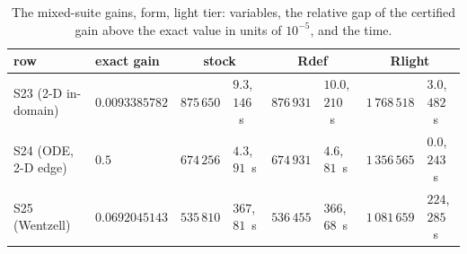 \begin{table}[h]\centering\scriptsize
\setlength{\tabcolsep}{4pt}
\begin{tabular}{llrlrlrl}
\toprule
row & exact gain & \multicolumn{2}{c}{stock} & \multicolumn{2}{c}{Rdef} & \multicolumn{2}{c}{Rlight} \\
\midrule
S23 (2-D in-domain) & $0.0093385782$ & $875\,650$ & $9.3$, $146$~s & $876\,931$ & $10.0$, $210$~s & $1\,768\,518$ & $3.0$, $482$~s \\
S24 (ODE, 2-D edge) & $0.5$ & $674\,256$ & $4.3$, $91$~s & $674\,931$ & $4.6$, $81$~s & $1\,356\,565$ & $0.0$, $243$~s \\
S25 (Wentzell) & $0.0692045143$ & $535\,810$ & $367$, $81$~s & $536\,455$ & $366$, $68$~s & $1\,081\,659$ & $224$, $285$~s \\
\bottomrule
\end{tabular}
\caption{The mixed-suite gains,  form, light tier: variables, the relative gap of the certified gain above the exact value in units of $10^{-5}$, and the time.}\label{tab:bl-mixed-gain}
\end{table}


